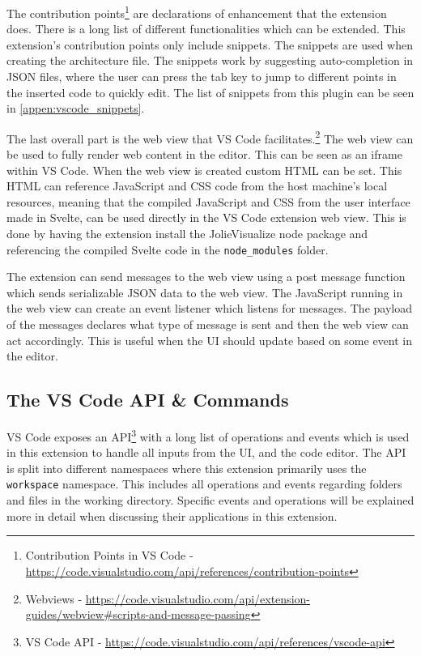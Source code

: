 The contribution points\footnote{Contribution Points in VS Code - \url{https://code.visualstudio.com/api/references/contribution-points}} are declarations of enhancement that the extension does. There is a long list of different functionalities which can be extended.
This extension's contribution points only include snippets. The snippets are used when creating the architecture file. The snippets work by suggesting auto-completion in JSON files, where the user can press the tab key to jump to different points in the inserted code to quickly edit.
The list of snippets from this plugin can be seen in \cref{appen:vscode_snippets}.

The last overall part is the web view that VS Code facilitates.\footnote{Webviews - \url{https://code.visualstudio.com/api/extension-guides/webview\#scripts-and-message-passing}} The web view can be used to fully render web content in the editor.
This can be seen as an iframe within VS Code. When the web view is created custom HTML can be set. This HTML can reference JavaScript and CSS code from the host machine's local resources, meaning that the compiled JavaScript and CSS from the user interface made in Svelte, can be used directly in the VS Code extension web view.
This is done by having the extension install the JolieVisualize node package and referencing the compiled Svelte code in the \texttt{node\_modules} folder.

The extension can send messages to the web view using a post message function which sends serializable JSON data to the web view.
The JavaScript running in the web view can create an event listener which listens for messages. The payload of the messages declares what type of message is sent and then the web view can act accordingly.
This is useful when the UI should update based on some event in the editor.

\subsection{The VS Code API \& Commands}
VS Code exposes an API\footnote{VS Code API - \url{https://code.visualstudio.com/api/references/vscode-api}} with a long list of operations and events
which is used in this extension to handle all inputs from the UI, and the code editor.
The API is split into different namespaces where this extension primarily uses the \texttt{workspace}
namespace. This includes all operations and events regarding folders and files in the working directory.
Specific events and operations will be explained more in detail when discussing their applications in this extension.

